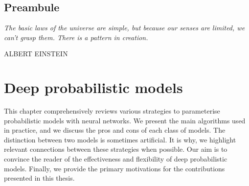 \thispagestyle{empty}
\section*{Preambule}

%

\vfill

{
\textit{\justify
   The basic laws of the universe are simple, but because our senses are limited, we can't grasp them. There is a pattern in creation.}

  \par\bigskip
  \raggedleft\MakeUppercase{Albert Einstein}\\
  \par%
}

\chapter{Deep probabilistic models}\label{ch:02C}

\begin{chapter_outline}

This chapter comprehensively reviews various strategies to parameterise probabilistic models with neural networks. We present the main algorithms used in practice, and we discuss the pros and cons of each class of models.
The distinction between two models is sometimes artificial. It is why, we highlight relevant connections between these strategies when possible.
Our aim is to convince the reader of the effectiveness and flexibility of deep probabilistic models. Finally, we provide the primary motivations for the contributions presented in this thesis.
\end{chapter_outline}

